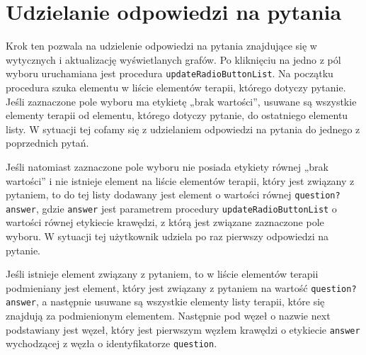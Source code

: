 \section{Udzielanie odpowiedzi na pytania}
Krok ten pozwala na udzielenie odpowiedzi na pytania znajdujące się w wytycznych i aktualizację wyświetlanych grafów.
Po kliknięciu na jedno z pól wyboru uruchamiana jest procedura \texttt{updateRadioButtonList}. Na początku procedura szuka elementu w liście elementów terapii, którego dotyczy pytanie. Jeśli zaznaczone pole wyboru ma etykietę „brak wartości”, usuwane są wszystkie elementy terapii od elementu, którego dotyczy pytanie, do ostatniego elementu listy. W sytuacji tej cofamy się z udzielaniem odpowiedzi na pytania do jednego z poprzednich pytań.

Jeśli natomiast zaznaczone pole wyboru nie posiada etykiety równej „brak wartości” i nie istnieje element na liście elementów terapii, który jest związany z pytaniem, to do tej listy dodawany jest element o wartości równej \texttt{question?answer}, gdzie \texttt{answer} jest parametrem procedury \texttt{updateRadioButtonList} o wartości równej etykiecie krawędzi, z którą jest związane zaznaczone pole wyboru. W sytuacji tej użytkownik udziela po raz pierwszy odpowiedzi na pytanie. 

Jeśli istnieje element związany z pytaniem, to w liście elementów terapii podmieniany jest element, który jest związany z pytaniem na wartość \texttt{question?answer}, a następnie usuwane są wszystkie elementy listy terapii, które się znajdują za podmienionym elementem. 
Następnie pod węzeł o nazwie next podstawiany jest węzeł, który jest pierwszym węzłem krawędzi o etykiecie \texttt{answer} wychodzącej z węzła o identyfikatorze \texttt{question}. 

